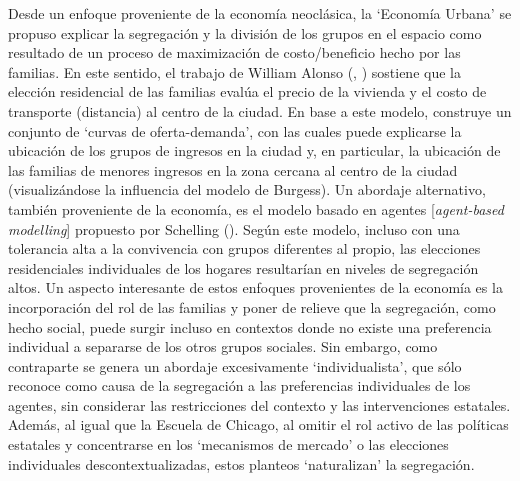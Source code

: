 \documentclass[
  spanish,
  a4paper,%
  chapterprefix=true,%
  DIV=calc,%
  twoside]{scrbook}%
\begin{document}
Desde un enfoque proveniente de la economía neoclásica,
la `Economía Urbana' se
propuso explicar la segregación y la división de los grupos en el
espacio como resultado de un proceso de maximización de costo/beneficio
hecho por las familias. En este sentido, el trabajo de William Alonso
(, ) sostiene que la elección residencial de las
familias evalúa el precio de la vivienda y el costo de transporte
(distancia) al centro de la ciudad. En base a este modelo, construye un
conjunto de `curvas de oferta-demanda', con las cuales puede explicarse
la ubicación de los grupos de ingresos en la ciudad y, en particular, la
ubicación de las familias de menores ingresos en la zona cercana al
centro de la ciudad (visualizándose la influencia del modelo de
Burgess). Un abordaje
alternativo, también proveniente de la economía, es el modelo basado en
agentes {[}\emph{agent-based modelling}{]} propuesto por Schelling (). Según
este modelo, incluso con una tolerancia alta a la convivencia con grupos
diferentes al propio, las elecciones residenciales individuales de los
hogares resultarían en niveles de segregación altos. Un aspecto
interesante de estos enfoques provenientes de la economía es la
incorporación del rol de las familias y poner de relieve que la
segregación, como hecho social, puede surgir incluso en contextos donde
no existe una preferencia individual a separarse de los otros grupos
sociales. Sin embargo, como contraparte se genera un abordaje
excesivamente `individualista', que sólo reconoce como causa de la
segregación a las preferencias individuales de los agentes, sin
considerar las restricciones del contexto y las intervenciones
estatales. Además, al igual que la Escuela de Chicago, al omitir el rol
activo de las políticas estatales y concentrarse en los `mecanismos de
mercado' o las elecciones individuales descontextualizadas, estos
planteos `naturalizan' la segregación.
\end{document}
